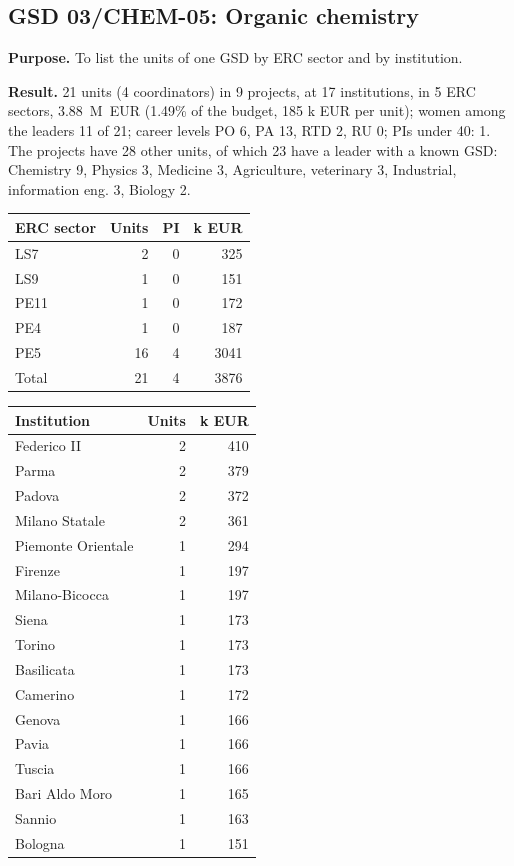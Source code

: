 \documentclass[11pt,a4paper]{article}
\begin{document}
\clearpage
\subsection{GSD 03/CHEM-05: Organic chemistry}
\textbf{Purpose.} To list the units of one GSD by ERC sector and by institution.

\textbf{Result.} 21 units (4 coordinators) in 9 projects, at 17 institutions, in 5 ERC sectors, 3.88~M~EUR (1.49\% of the budget, 185 k EUR per unit); women among the leaders 11 of 21; career levels PO 6, PA 13, RTD 2, RU 0; PIs under 40: 1. The projects have 28 other units, of which 23 have a leader with a known GSD: Chemistry 9, Physics 3, Medicine 3, Agriculture, veterinary 3, Industrial, information eng. 3, Biology 2.

{\footnotesize
\begin{longtable}{lrrr}
\toprule
ERC sector & Units & PI & k EUR \\
\midrule
\endhead
LS7 & 2 & 0 & 325 \\
LS9 & 1 & 0 & 151 \\
PE11 & 1 & 0 & 172 \\
PE4 & 1 & 0 & 187 \\
PE5 & 16 & 4 & 3041 \\
\midrule
Total & 21 & 4 & 3876 \\
\bottomrule
\end{longtable}
}
{\footnotesize
\begin{longtable}{lrr}
\toprule
Institution & Units & k EUR \\
\midrule
\endhead
Federico II & 2 & 410 \\
Parma & 2 & 379 \\
Padova & 2 & 372 \\
Milano Statale & 2 & 361 \\
Piemonte Orientale & 1 & 294 \\
Firenze & 1 & 197 \\
Milano-Bicocca & 1 & 197 \\
Siena & 1 & 173 \\
Torino & 1 & 173 \\
Basilicata & 1 & 173 \\
Camerino & 1 & 172 \\
Genova & 1 & 166 \\
Pavia & 1 & 166 \\
Tuscia & 1 & 166 \\
Bari Aldo Moro & 1 & 165 \\
Sannio & 1 & 163 \\
Bologna & 1 & 151 \\
\bottomrule
\end{longtable}
}
\end{document}

